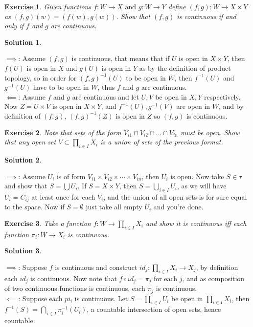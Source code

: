 \documentclass[11pt,a4paper]{article}
\newtheorem{Ex}{Exercise}
\newtheorem{Sol}{Solution}
\begin{document}
\begin{Ex}
	Given functions $f: W \rightarrow X \text{ and } g: W \rightarrow Y$ define $(f,g): W \rightarrow X \times Y$ as $(f,g)(w)=(f(w),g(w))$. Show that $(f,g)$ is continuous if and only if $f$ and $g$ are continuous.  
\end{Ex} 
\begin{Sol} \end{Sol} 
\noindent $\implies$: Assume $(f,g)$ is continuous, that means that if $U$ is open in $X \times Y$, then $f(U)$ is open in $X$ and $g(U)$ is open in $Y$ as by the definition of product topology, so in order for $(f,g)^{-1}(U)$ to be open in $W$, then $f^{-1}(U)$ and $g^{-1}(U)$ have to be open in $W$, thus $f$ and $g$ are continuous. \\
\noindent $\impliedby$: Assume $f$ and $g$ are continuous and let $U, V$ be open in $X, Y$ respectively. Now $Z = U \times V$ is open in $X \times Y$, and $f^{-1}(U), g^{-1}(V)$ are open in $W$, and by definition of $(f,g)$, $(f,g)^{-1}(Z)$ is open in  $Z$ so $(f,g)$ is continuous.

\begin{Ex}
	Note that sets of the form $V_{i1} \cap V_{i2} \cap \dots \cap V_{in}$ must be open. Show that any open set $V \subset \prod_{i \in I}X_i$ is a union of sets of the previous format.
\end{Ex}  

\begin{Sol} \end{Sol} 
\noindent $\implies$: Assume $U_i$ is of form $V_{i1} \times V_{i2} \times \cdots \times V_{in}$, then $U_i$ is open. Now take $S \in \tau$ and show that $S = \bigcup U_i$. If $S = X \times Y$, then $S = \bigcup_{i \in I}U_i$, as we will have $U_i = C_{ij}$ at least once for each $V_{ij}$ and the union of all open sets is for sure equal to the space. Now if $S = \emptyset$ just take all empty $U_i$ and you're done.

\begin{Ex}
	Take a function $f: W \rightarrow \prod_{i \in I}X_i$ and show it is continuous iff each function $\pi_i : W \rightarrow X_i$ is continuous.  
\end{Ex}   

\begin{Sol}\end{Sol}
\noindent $\implies$: Suppose $f$ is continuous and construct $id_j : \prod_{i \in I}X_i \rightarrow X_j$, by definition each $id_j$ is continuous. Now note that $f \circ id_j = \pi_j$ for each $j$, and as composition of two continuous functions is continuous, each $\pi_j$ is continuous.  \\
\noindent$\impliedby$: Suppose each $pi_i$ is continuous. Let $S= \prod_{i \in I}U_i$ be open in $\prod_{i \in I}X_i$, then $f^{-1}(S) = \bigcap_{i \in I}\pi_i^{-1}(U_i)$, a countable intersection of open sets, hence countable.
\end{document}
